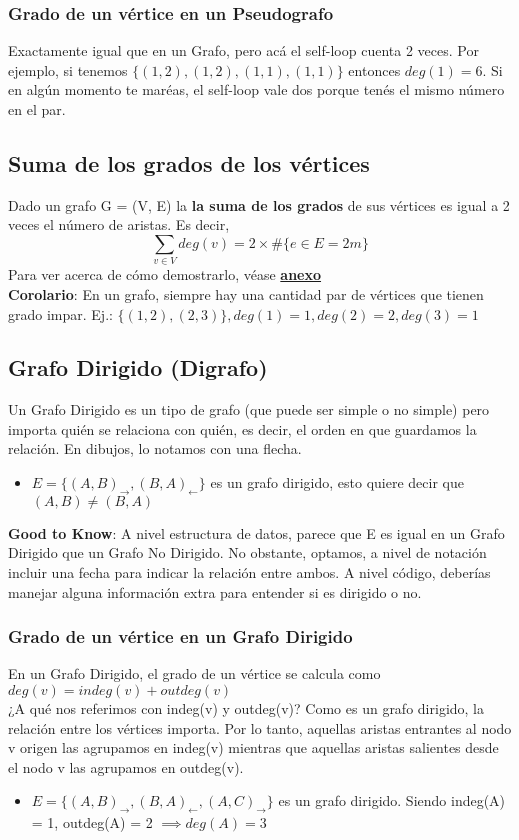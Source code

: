 \documentclass[10pt,a4paper]{article}
\begin{document}
\subsubsection*{Grado de un vértice en un Pseudografo}
Exactamente igual que en un Grafo, pero acá el self-loop cuenta 2 veces. Por ejemplo, si tenemos $\{(1,2), (1,2), (1, 1), (1, 1)\}$ entonces $deg(1) = 6$. Si en algún momento te maréas, el self-loop vale dos porque tenés el mismo número en el par.
\subsection*{Suma de los grados de los vértices}
Dado un grafo G = (V, E) la \textbf{la suma de los grados} de sus vértices es igual a 2 veces el número de aristas. Es decir, 
\[\sum_{v \in V} deg(v) = 2 \times \#\{e \in E = 2m\}\]
Para ver acerca de cómo demostrarlo, véase \hyperref[subsubsec:suma_grados_vertices]{\textbf{anexo}} \\
\textbf{Corolario}: En un grafo, siempre hay una cantidad par de vértices que tienen grado impar. Ej.: $\{(1, 2), (2, 3)\}, deg(1) = 1, deg(2) = 2, deg(3) = 1$
\subsection*{Grafo Dirigido (Digrafo)}
Un Grafo Dirigido es un tipo de grafo (que puede ser simple o no simple) pero importa quién se relaciona con quién, es decir, el orden en que guardamos la relación. En dibujos, lo notamos con una flecha. 
\begin{itemize}
    \item $E = \{(A,B)_{\rightarrow}, (B, A)_{\leftarrow} \}$ es un grafo dirigido, esto quiere decir que $(A,B) \neq (B, A)$
\end{itemize}
\textbf{Good to Know}: A nivel estructura de datos, parece que E es igual en un Grafo Dirigido que un Grafo No Dirigido. No obstante, optamos, a nivel de notación incluir una fecha para indicar la relación entre ambos. A nivel código, deberías manejar alguna información extra para entender si es dirigido o no.
\subsubsection*{Grado de un vértice en un Grafo Dirigido}
En un Grafo Dirigido, el grado de un vértice se calcula como $deg(v) = indeg(v) + outdeg(v)$ \\
¿A qué nos referimos con indeg(v) y outdeg(v)? Como es un grafo dirigido, la relación entre los vértices importa. Por lo tanto, aquellas aristas entrantes al nodo v origen las agrupamos en indeg(v) mientras que aquellas aristas salientes desde el nodo v las agrupamos en outdeg(v).
\begin{itemize}
    \item $E = \{(A,B)_{\rightarrow}, (B, A)_{\leftarrow}, (A, C)_{\rightarrow} \}$ es un grafo dirigido. Siendo indeg(A) = 1, outdeg(A) = 2 $\implies deg(A) = 3$ 
\end{itemize}
\end{document}

